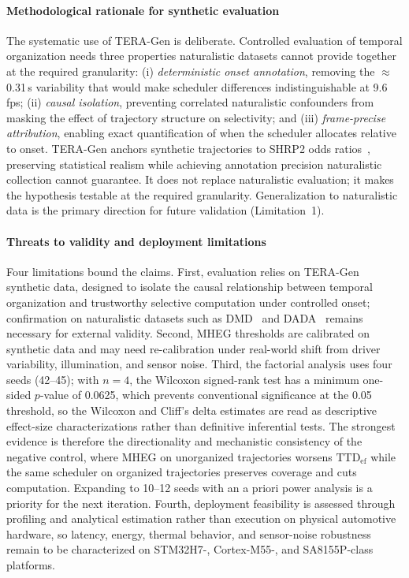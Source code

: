 \documentclass[a4paper,fleqn]{cas-dc}
\newcommand{\TERAGen}{\mbox{TERA-Gen}\xspace}
\newcommand{\MHEG}{\mbox{MHEG}\xspace}
\begin{document}
\paragraph{Methodological rationale for synthetic evaluation}
The systematic use of \TERAGen is deliberate. Controlled evaluation of temporal
organization needs three properties naturalistic datasets cannot provide
together at the required granularity: (i) \emph{deterministic onset annotation},
removing the $\approx$0.31\,s variability that would make scheduler differences
indistinguishable at 9.6\,fps; (ii) \emph{causal isolation}, preventing
correlated naturalistic confounders from masking the effect of trajectory
structure on selectivity; and (iii) \emph{frame-precise attribution}, enabling
exact quantification of when the scheduler allocates relative to onset. \TERAGen
anchors synthetic trajectories to SHRP2 odds ratios~\cite{dingus2016shrp2},
preserving statistical realism while achieving annotation precision naturalistic
collection cannot guarantee. It does not replace naturalistic evaluation; it
makes the hypothesis testable at the required granularity. Generalization to
naturalistic data is the primary direction for future validation (Limitation~1).
\paragraph{Threats to validity and deployment limitations}
\label{sec:limitations}
Four limitations bound the claims. First, evaluation relies on \TERAGen
synthetic data, designed to isolate the causal relationship between temporal
organization and trustworthy selective computation under controlled onset;
confirmation on naturalistic datasets such as DMD~\cite{ortega2020dmd} and
DADA~\cite{fang2022dada} remains necessary for external validity. Second, \MHEG
thresholds are calibrated on synthetic data and may need re-calibration under
real-world shift from driver variability, illumination, and sensor noise. Third,
the factorial analysis uses four seeds (42--45); with $n=4$, the Wilcoxon
signed-rank test has a minimum one-sided $p$-value of 0.0625, which prevents
conventional significance at the 0.05 threshold, so the Wilcoxon and Cliff's
delta estimates are read as descriptive effect-size characterizations rather
than definitive inferential tests. The strongest evidence is therefore the
directionality and mechanistic consistency of the negative control, where \MHEG
on unorganized trajectories worsens $\mathrm{TTD}_{\mathrm{ef}}$ while the same
scheduler on organized trajectories preserves coverage and cuts computation.
Expanding to 10--12 seeds with an a priori power analysis is a priority for the
next iteration. Fourth, deployment feasibility is assessed through profiling and
analytical estimation rather than execution on physical automotive hardware, so
latency, energy, thermal behavior, and sensor-noise robustness remain to be
characterized on STM32H7-, Cortex-M55-, and SA8155P-class platforms.
\end{document}
